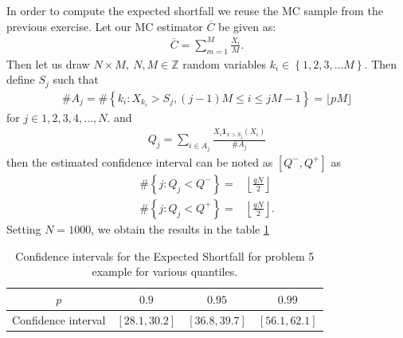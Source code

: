 \documentclass[a4paper,11pt]{article}
\newcommand{\parent}[1]{\left( {#1} \right)}
\newcommand{\sset}[1]{\left\lbrace {#1} \right\rbrace }
\newcommand{\ssum}[2]{\displaystyle\sum\limits_{#1}^{#2}}
\begin{document}
In order to compute the expected shortfall we reuse the MC sample from the previous exercise.
Let our MC estimator $\overline C$ be given as:
\begin{align}
\overline C = \ssum{m=1}{M} \frac{X_i}{M}.
\end{align}
Then let us draw $N\times M, ~ N,M \in \mathbb Z$ random variables
$k_i \in \sset{1,2,3,...M}$. Then define $S_j$ such that
\begin{align}
\# A_j =\# \sset{k_i: X_{k_i}>S_j, \parent{j-1 }M \leq i \leq jM-1} = \lfloor pM \rfloor
\end{align}
for $j \in {1,2,3,4,...,N}$. and
\begin{align}
Q _j = \ssum{i \in A_j}{} \frac{X_i \mathbf{1}_{x>S_j} \parent{X_i}}{\# A_j}
\end{align}
then the estimated confidence interval can be noted as $[Q^-,Q^+]$
as
\begin{align}
\# \sset{j: Q_j<Q^{-}} =& \left \lfloor \frac{qN}{2} \right \rfloor \\
\# \sset{j: Q_j<Q^{+}} =&  \left \lfloor \frac{qN}{2} \right \rfloor .
\end{align}
Setting $N=1000$, we obtain the results in the table \ref{tb:BS}

\begin{table}
\begin{center}
\begin{tabular}{c c c c }
  $p$ & $0.9$  & $0.95$  &  $0.99$ \\
  \hline
Confidence interval & $[28.1, 30.2]$ & $[36.8, 39.7]$ & $[56.1, 62.1]$ 
\end{tabular}
\end{center}
\caption{\label{tb:BS}
Confidence intervals for the Expected Shortfall for problem 5 example
for various quantiles.
}
\end{table}
\end{document}

